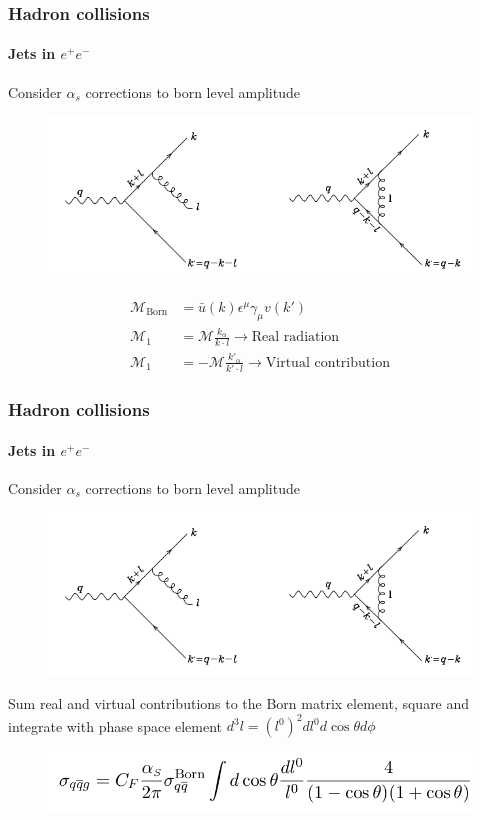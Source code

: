 \documentclass[aspectratio=43]{beamer}
\begin{document}
\begin{frame}
	
	\frametitle{Hadron collisions}
	\framesubtitle{Jets in $e^{+}e^{-}$}
	
	Consider $\alpha_{s}$ corrections to born level amplitude
	
	\begin{figure}
		\includegraphics[width = 7 cm]{plots/qcd_corrections_2.png}
	\end{figure}

	\begin{align}
		\mathcal{M}_{\textrm{Born}} &= \bar{u}(k)\epsilon^{\mu}\gamma_{\mu}v(k') \nonumber \\
		\mathcal{M}_{1} &= \mathcal{M} \frac{k_{\alpha}}{k \cdot l} \longrightarrow \textrm{Real radiation} \nonumber \\
		\mathcal{M}_{1} &= -\mathcal{M} \frac{k'_{\alpha}}{k' \cdot l} \longrightarrow \textrm{Virtual contribution} \nonumber		 
	\end{align}

\end{frame}

\begin{frame}

	\frametitle{Hadron collisions}
	\framesubtitle{Jets in $e^{+}e^{-}$}
	
	Consider $\alpha_{s}$ corrections to born level amplitude
	
	\begin{figure}
		\includegraphics[width = 7 cm]{plots/qcd_corrections_2.png}
	\end{figure}
	
	Sum real and virtual contributions to the Born matrix element, square and integrate with phase space element $d^{3}l = (l^{0})^{2} dl^{0} d\cos\theta d\phi$
	\begin{figure}
		\includegraphics[width = 9.5 cm]{plots/eq_qqbg.png}
	\end{figure}

\end{frame}
\end{document}
